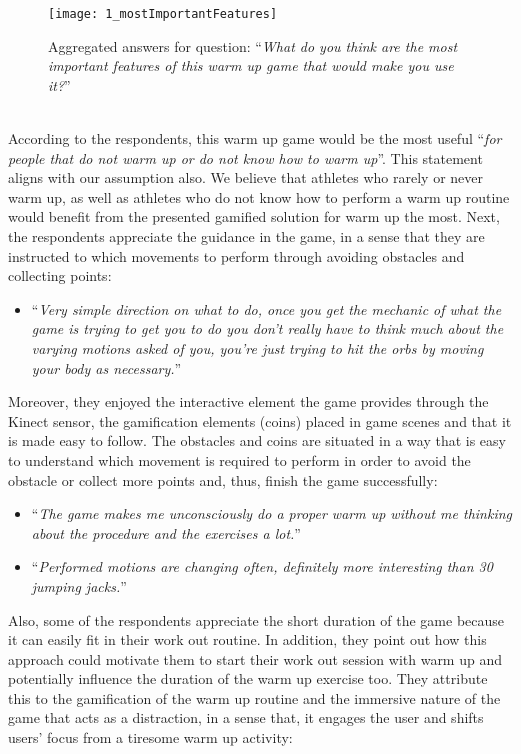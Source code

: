 \begin{figure}[h]
    \centering
    \texttt{[image: 1\_mostImportantFeatures]}
    \caption{Aggregated answers for question: ``\textit{What do you think are the most important features of this warm up game that would make you use it?}''}
    \label{fig:1_mostImportantFeatures}
\end{figure}\\ According to the respondents, this warm up game would be the most useful ``\textit{for people that do not warm up or do not know how to warm up}''. This statement aligns with our assumption also. We believe that athletes who rarely or never warm up, as well as athletes who do not know how to perform a warm up routine would benefit from the presented gamified solution for warm up the most. Next, the respondents appreciate the guidance in the game, in a sense that they are instructed to which movements to perform through avoiding obstacles and collecting points:
\begin{itemize}
\item ``\textit{Very simple direction on what to do, once you get the mechanic of what the game is trying to get you to do you don't really have to think much about the varying motions asked of you, you're just trying to hit the orbs by moving your body as necessary.}''
\end{itemize} 
Moreover, they enjoyed the interactive element the game provides through the Kinect sensor, the gamification elements (coins) placed in game scenes and that it is made easy to follow. The obstacles and coins are situated in a way that is easy to understand which movement is required to perform in order to avoid the obstacle or collect more points and, thus, finish the game successfully:
\begin{itemize}
\item ``\textit{The game makes me unconsciously do a proper warm up without me thinking about the procedure and the exercises a lot.}''
\item ``\textit{Performed motions are changing often, definitely more interesting than 30 jumping jacks.}''
\end{itemize} 
Also, some of the respondents appreciate the short duration of the game because it can easily fit in their work out routine. In addition, they point out how this approach could motivate them to start their work out session with warm up and potentially influence the duration of the warm up exercise too. They attribute this to the gamification of the warm up routine and the immersive nature of the game that acts as a distraction, in a sense that, it engages the user and shifts users' focus from a tiresome warm up activity:  
